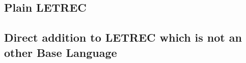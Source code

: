 \documentclass[../codeprint.tex]{subfiles}
\begin{document}
\subsection{Plain LETREC}



\subsection{Direct addition to LETREC which is not an other Base Language}
\end{document}
